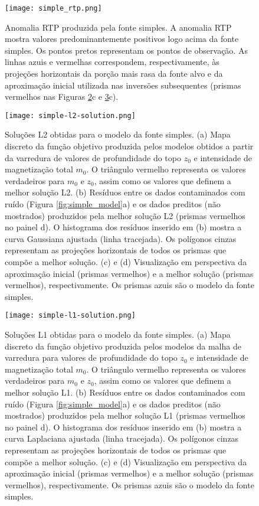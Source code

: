 \pagebreak

\begin{figure}[!htb]
	\centering
	\texttt{[image: simple\_rtp.png]}
	\caption{Anomalia RTP produzida pela fonte simples. 
		A anomalia RTP mostra valores predominantemente positivos logo acima da fonte simples. Os pontos pretos representam os pontos de observação. As linhas azuis e vermelhas correspondem, respectivamente, às projeções horizontais da porção mais rasa da fonte alvo e da aproximação inicial utilizada nas inversões subsequentes (prismas vermelhos nas Figuras \ref{fig:simple_l2_result}c e 
		\ref{fig:simple_l1_result}c).
	}
	\label{fig:simple_model_rtp}
\end{figure}

\pagebreak

\begin{figure}[!htb]
	\centering
	\texttt{[image: simple-l2-solution.png]}
	\caption{Soluções L2 obtidas para o modelo da fonte simples. 
		(a) Mapa discreto da função objetivo produzida pelos modelos obtidos a partir da varredura de valores de profundidade do topo $z_{0}$ e intensidade de magnetização total $m_{0}$. 
		O triângulo vermelho representa os valores verdadeiros para $m_{0}$ e $z_{0}$, assim como os valores que definem a melhor solução L2.
		(b) Resíduos entre os dados contaminados com ruído (Figura \ref{fig:simple_model}a) 
		e os dados preditos (não mostrados) produzidos pela melhor solução L2 (prismas vermelhos no painel d). 
		O histograma dos resíduos inserido em (b) mostra a curva Gaussiana ajustada (linha tracejada).
		Os polígonos cinzas representam as projeções horizontais de todos os prismas que compõe a melhor solução. 
		(c) e (d) Visualização em perspectiva da aproximação inicial (prismas vermelhos) e 
		a melhor solução (prismas vermelhos), respectivamente. Os prismas azuis são o modelo da fonte simples. 
	}
	\label{fig:simple_l2_result}
\end{figure}
\pagebreak

\begin{figure}[!htb]
	\centering
	\texttt{[image: simple-l1-solution.png]}
	\caption{Soluções L1 obtidas para o modelo da fonte simples. 
		(a) Mapa discreto da função objetivo produzida pelos modelos da malha de varredura para valores de profundidade do topo $z_{0}$ e intensidade de magnetização total $m_{0}$. 
		O triângulo vermelho representa os valores verdadeiros para $m_{0}$ e $z_{0}$, assim como os valores que definem a melhor solução L1.
		(b) Resíduos entre os dados contaminados com ruído (Figura \ref{fig:simple_model}a) 
		e os dados preditos (não mostrados) produzidos pela melhor solução L1 (prismas vermelhos no painel d). 
		O histograma dos resíduos inserido em (b) mostra a curva Laplaciana ajustada (linha tracejada).
		Os polígonos cinzas representam as projeções horizontais de todos os prismas que compõe a melhor solução. 
		(c) e (d) Visualização em perspectiva da aproximação inicial (prismas vermelhos) e 
		a melhor solução (prismas vermelhos), respectivamente. Os prismas azuis são o modelo da fonte simples. 
	}
	\label{fig:simple_l1_result}
\end{figure}

